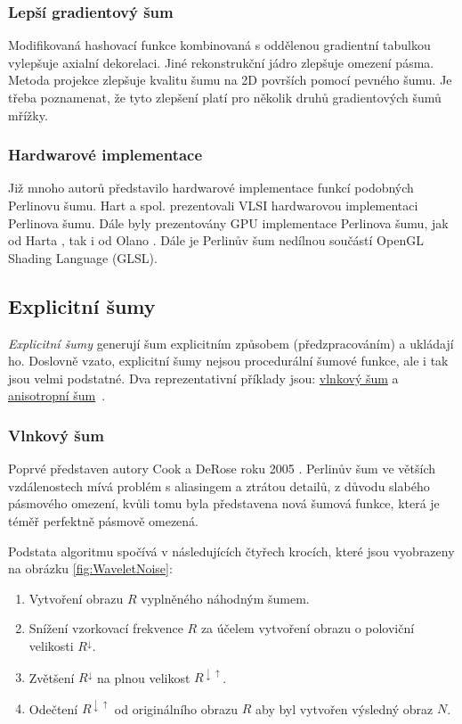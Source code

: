 \subsubsection{Lepší gradientový šum}
Modifikovaná hashovací funkce kombinovaná s oddělenou gradientní tabulkou vylepšuje axialní dekorelaci. Jiné rekonstrukční jádro zlepšuje omezení pásma. Metoda projekce zlepšuje kvalitu šumu na 2D površích pomocí pevného šumu. Je třeba poznamenat, že tyto zlepšení platí pro několik druhů gradientových šumů mřížky. \cite{Kensler2008}

\subsubsection{Hardwarové implementace}
Již mnoho autorů představilo hardwarové implementace funkcí podobných Perlinovu šumu. Hart a spol. \cite{hart1999antialiased} prezentovali VLSI hardwarovou implementaci Perlinova šumu. Dále byly prezentovány GPU implementace Perlinova šumu, jak od Harta \cite{hart01}, tak i od Olano \cite{ola05}. Dále je Perlinův šum nedílnou součástí OpenGL Shading Language (GLSL).

\subsection{Explicitní šumy}
\label{ExplicitNoises}
\textit{Explicitní šumy} generují šum explicitním způsobem (předzpracováním) a ukládají ho. Doslovně vzato, explicitní šumy nejsou procedurální šumové funkce, ale i tak jsou velmi podstatné. Dva reprezentativní příklady jsou: \hyperref[WaveletNoise]{vlnkový šum} a \hyperref[AnisotropNoise]{anisotropní šum}~\cite{Lagae10}.

\subsubsection{Vlnkový šum}
\label{WaveletNoise}
Poprvé představen autory Cook a DeRose roku 2005 \cite{Cook05}. Perlinův šum ve větších vzdálenostech mívá problém s aliasingem a ztrátou detailů, z důvodu slabého pásmového omezení, kvůli tomu byla představena nová šumová funkce, která je téměř perfektně pásmově omezená.

Podstata algoritmu spočívá v následujících čtyřech krocích, které jsou vyobrazeny na obrázku \ref{fig:WaveletNoise}:

\begin{enumerate}
	\item Vytvoření obrazu $R$ vyplněného náhodným šumem.
	\item Snížení vzorkovací frekvence $R$ za účelem vytvoření obrazu o poloviční velikosti $R^\downarrow$.
	\item Zvětšení $R^\downarrow$ na plnou velikost $R^{\downarrow\uparrow}$.
	\item Odečtení $R^{\downarrow\uparrow}$ od originálního obrazu $R$ aby byl vytvořen výsledný obraz $N$.
\end{enumerate}


